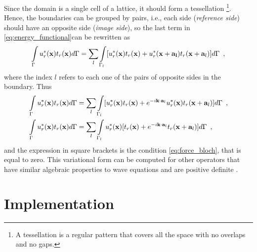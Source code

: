 Since the domain is a single cell of a lattice, it should form a tessellation \footnote{A tessellation is a regular pattern that covers all the space with no overlaps and no gaps.}. Hence, the boundaries can be grouped by pairs, i.e., each side (\emph{reference side}) should have an opposite side  (\emph{image side}), so the last term in \eqref{eq:energy_functional}can be rewritten as
\[ \int\limits_{\Gamma} u_r^{*}(\mathbf{x}) t_r(\mathbf{x}) d\Gamma = \sum\limits_{l} \int\limits_{\Gamma_l} [ u_r^{*}(\mathbf{x}) t_r(\mathbf{x}) + u_r^{*}(\mathbf{x+\mathbf{a}_l}) t_r(\mathbf{x}+\mathbf{a}_l) ]d\Gamma \enspace ,\]
where the index $l$ refers to each one of the pairs of opposite sides in the boundary. Thus
\begin{align*}
\int\limits_{\Gamma} u_r^{*}(\mathbf{x}) t_r(\mathbf{x}) d\Gamma &= \sum\limits_{l} \int\limits_{\Gamma_l} [ u_r^{*}(\mathbf{x}) t_r(\mathbf{x}) +e^{-i\mathbf{k}\cdot\mathbf{a}_l} u_r^{*}(\mathbf{x}) t_r(\mathbf{x}+\mathbf{a}_l) ]d\Gamma \enspace , \\
\int\limits_{\Gamma} u_r^{*}(\mathbf{x}) t_r(\mathbf{x}) d\Gamma &= \sum\limits_{l} \int\limits_{\Gamma_l} u_r^{*}(\mathbf{x})[ t_r(\mathbf{x}) +e^{-i\mathbf{k}\cdot\mathbf{a}_l} t_r(\mathbf{x}+\mathbf{a}_l) ]d\Gamma \enspace ,
\end{align*}
and the expression in square brackets is the condition \eqref{eq:force_bloch}, that is equal to zero. This variational form can be computed for other operators that have similar algebraic properties to wave equations and are positive definite \cite{algebraic_waves, book:reddy_functional_analysis, book:kreyzsig_functional}.

\section{Implementation}

